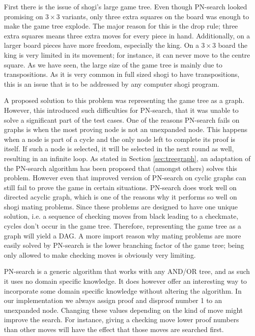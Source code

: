 \documentclass[a4paper, 11pt]{article}
\begin{document}
First there is the issue of shogi's large game tree. Even though PN-search looked promising on $3 \times 3$ variants, only three extra
squares on the board was enough to make the game tree explode. The major reason for this is the drop rule; three extra squares means three
extra moves for every piece in hand. Additionally, on a larger board pieces have more freedom, especially the king. On a $3 \times 3$ board
the king is very limited in its movement; for instance, it can never move to the centre square. As we have seen, the large size of the game
tree is mainly due to transpositions. As it is very common in full sized shogi to have transpositions, this is an issue that is to be addressed
by any computer shogi program.

A proposed solution to this problem was representing the game tree as a graph. However, this introduced such difficulties for PN-search, that it
was unable to solve a significant part of the test cases.
One of the reasons PN-search fails on graphs is when the most proving node is not an unexpanded node. This happens when a node is part of a cycle
and the only node left to complete its proof is itself. If such a node is selected, it will be selected in the next round as well, resulting
in an infinite loop. As stated in Section \ref{sec:treegraph}, an adaptation of the PN-search algorithm has been proposed that (amongst others)
solves this problem. However even that improved version of PN-search on cyclic graphs can still fail to prove the game in certain situations.
PN-search does work well on directed acyclic graph, which is one of the reasons why it performs so well on shogi mating problems. Since these problems
are designed to have one unique solution, i.e. a sequence of checking moves from black leading to a checkmate, cycles don't occur in the
game tree. Therefore, representing the game tree as a graph will yield a DAG. A more import reason why mating problems are more easily solved
by PN-search is the lower branching factor of the game tree; being only allowed to make checking moves is obviously very limiting.

PN-search is a generic algorithm that works with any AND/OR tree, and as such it uses no domain specific knowledge.
It does however offer an interesting way to incorporate some domain specific
knowledge without altering the algorithm. In our implementation we always assign proof and disproof number 1 to an unexpanded node. Changing
these values depending on the kind of move might improve the search. For instance, giving a checking move lower proof numbers than other moves
will have the effect that those moves are searched first.\\
\end{document}
